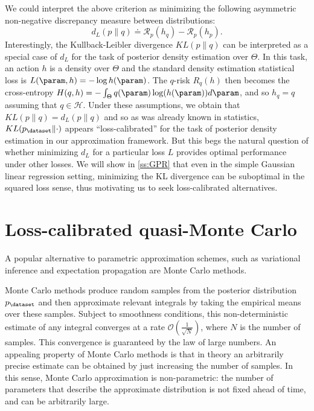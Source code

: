 We could interpret the above criterion as minimizing the following asymmetric non-negative discrepancy measure between distributions:
\begin{equation} \label{e:d_L}
	d_L(p\|q) \doteq \mathcal{R}_{p}(h_q) - \mathcal{R}_{p}(h_p).
\end{equation}
Interestingly, the Kullback-Leibler divergence $KL(p\|q)$ can be interpreted as a special case of $d_L$ for the task of posterior density estimation over $\Theta$. In this task, an action $h$ is a density over $\Theta$ and the standard density estimation statistical loss is $L(\param,h) = -\log h(\param)$. The $q$-risk $R_q(h)$ then becomes the cross-entropy $H(q,h)=-\int_\Theta q(\param) \log(h(\param)) d\param$, and so $h_q = q$ assuming that $q \in \mathcal{H}$. Under these assumptions, we obtain that $KL(p\|q) = d_L(p\|q)$ and so as was already known in statistics, $KL(p_\dataset\|\cdot)$ appears ``loss-calibrated'' for the task of posterior density estimation in our approximation framework. But this begs the natural question of whether minimizing $d_L$ for a particular loss $L$ provides optimal performance under other losses. We will show in \ref{ss:GPR} that even in the simple Gaussian linear regression setting, minimizing the KL divergence can be suboptimal in the squared loss sense, thus motivating us to seek loss-calibrated alternatives.



\section{Loss-calibrated quasi-Monte Carlo}

A popular alternative to parametric approximation schemes, such as variational inference and expectation propagation are Monte Carlo methods.

Monte Carlo methods produce random samples from the posterior distribution $p_\dataset$ and then approximate relevant integrals by taking the empirical means over these samples. Subject to smoothness conditions, this non-deterministic estimate of any integral converges at a rate $\mathcal{O}(\frac{1}{\sqrt{N}})$, where $N$ is the number of samples. This convergence is guaranteed by the law of large numbers. An appealing property of Monte Carlo methods is that in theory an arbitrarily precise estimate can be obtained by just increasing the number of samples. In this sense, Monte Carlo approximation is non-parametric: the number of parameters that describe the approximate distribution is not fixed ahead of time, and can be arbitrarily large.


